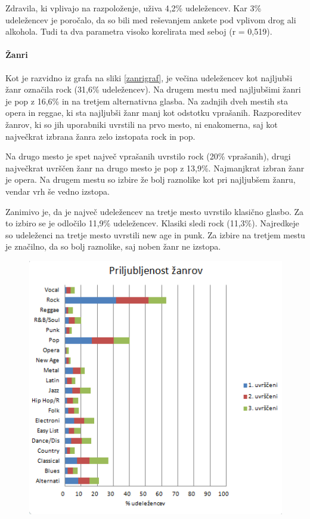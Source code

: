 \documentclass[a4paper, 12pt]{book}
\begin{document}
{Zdravila, ki vplivajo na razpoloženje, uživa 4,2\% udeležencev. Kar 3\% udeležencev je poročalo, da so bili med reševanjem ankete pod vplivom drog ali alkohola. Tudi ta dva parametra visoko korelirata med seboj (r = 0,519).

\paragraph{Žanri}

Kot je razvidno iz grafa na sliki \ref{zanrigraf}, je večina udeležencev kot najljubši žanr označila rock (31,6\% udeležencev). Na drugem mestu med najljubšimi žanri je pop z 16,6\% in na tretjem alternativna glasba. Na zadnjih dveh mestih sta opera in reggae, ki sta najljubši žanr manj kot odstotku vprašanih. Razporeditev žanrov, ki so jih uporabniki uvrstili na prvo mesto, ni enakomerna, saj kot največkrat izbrana žanra zelo izstopata rock in pop.  

Na drugo mesto je spet največ vprašanih uvrstilo rock (20\% vprašanih), drugi največkrat uvrščen žanr na drugo mesto je pop z 13,9\%. Najmanjkrat izbran žanr je opera. Na drugem mestu so izbire že bolj raznolike kot pri najljubšem žanru, vendar vrh še vedno izstopa. 

Zanimivo je, da je največ udeležencev na tretje mesto uvrstilo klasično glasbo. Za to izbiro se je odločilo 11,9\% udeležencev. Klasiki sledi rock (11,3\%). Najredkeje so udeleženci na tretje mesto uvrstili new age in punk. Za izbire na tretjem mestu je značilno, da so bolj raznolike, saj noben žanr ne izstopa. 

\begin{figure}[hbt]
\centering
\includegraphics{images/genre.png}


\end{figure}}
\end{document}
